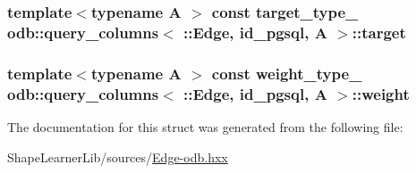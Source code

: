 \subsubsection[{target}]{\setlength{\rightskip}{0pt plus 5cm}template$<$typename A $>$ const target\+\_\+type\+\_\+ odb\+::query\+\_\+columns$<$ \+::{\bf Edge}, id\+\_\+pgsql, A $>$\+::target\hspace{0.3cm}{\ttfamily [static]}}\label{structodb_1_1query__columns_3_01_1_1_edge_00_01id__pgsql_00_01_a_01_4_a801689c32630da6979f14feb9dd24356}
\hypertarget{structodb_1_1query__columns_3_01_1_1_edge_00_01id__pgsql_00_01_a_01_4_a525f3e591edc29634723a9bd128fc9c6}{}
\subsubsection[{weight}]{\setlength{\rightskip}{0pt plus 5cm}template$<$typename A $>$ const {\bf weight\+\_\+type\+\_\+} odb\+::query\+\_\+columns$<$ \+::{\bf Edge}, id\+\_\+pgsql, A $>$\+::weight\hspace{0.3cm}{\ttfamily [static]}}\label{structodb_1_1query__columns_3_01_1_1_edge_00_01id__pgsql_00_01_a_01_4_a525f3e591edc29634723a9bd128fc9c6}


The documentation for this struct was generated from the following file\+:\begin{DoxyCompactItemize}
\item 
Shape\+Learner\+Lib/sources/\hyperlink{_edge-odb_8hxx}{Edge-\/odb.\+hxx}\end{DoxyCompactItemize}
